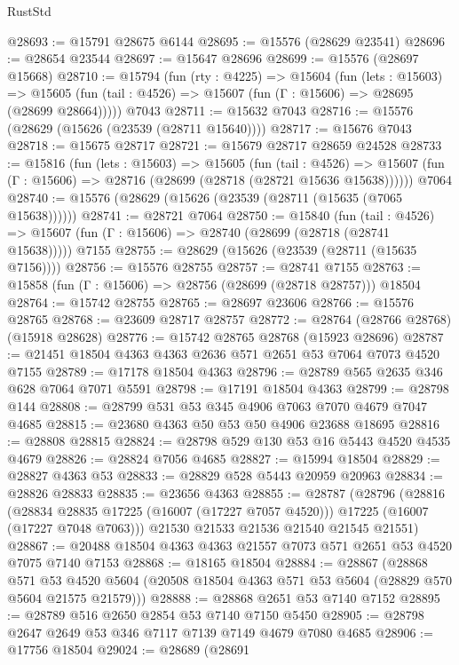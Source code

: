 \begin{lexlean}{RustStd}
\begin{coremodule}
@28693 := @15791 @28675 @6144
@28695 := @15576 (@28629 @23541)
@28696 := @28654 @23544
@28697 := @15647 @28696
@28699 := @15576 (@28697 @15668)
@28710 := @15794
    (fun (rty : @4225) =>
    @15604
      (fun (lets : @15603) =>
      @15605 (fun (tail : @4526) => @15607 (fun (Γ : @15606) => @28695 (@28699 @28664)))))
    @7043
@28711 := @15632 @7043
@28716 := @15576 (@28629 (@15626 (@23539 (@28711 @15640))))
@28717 := @15676 @7043
@28718 := @15675 @28717
@28721 := @15679 @28717 @28659 @24528
@28733 := @15816
    (fun (lets : @15603) =>
    @15605
      (fun (tail : @4526) =>
      @15607 (fun (Γ : @15606) => @28716 (@28699 (@28718 (@28721 @15636 @15638))))))
    @7064
@28740 := @15576 (@28629 (@15626 (@23539 (@28711 (@15635 (@7065 @15638))))))
@28741 := @28721 @7064
@28750 := @15840
    (fun (tail : @4526) => @15607 (fun (Γ : @15606) => @28740 (@28699 (@28718 (@28741 @15638)))))
    @7155
@28755 := @28629 (@15626 (@23539 (@28711 (@15635 @7156))))
@28756 := @15576 @28755
@28757 := @28741 @7155
@28763 := @15858 (fun (Γ : @15606) => @28756 (@28699 (@28718 @28757))) @18504
@28764 := @15742 @28755
@28765 := @28697 @23606
@28766 := @15576 @28765
@28768 := @23609 @28717 @28757
@28772 := @28764 (@28766 @28768) (@15918 @28628)
@28776 := @15742 @28765 @28768 (@15923 @28696)
@28787 := @21451 @18504 @4363 @4363 @2636 @571 @2651 @53 @7064 @7073 @4520 @7155
@28789 := @17178 @18504 @4363
@28796 := @28789 @565 @2635 @346 @628 @7064 @7071 @5591
@28798 := @17191 @18504 @4363
@28799 := @28798 @144
@28808 := @28799 @531 @53 @345 @4906 @7063 @7070 @4679 @7047 @4685
@28815 := @23680 @4363 @50 @53 @50 @4906 @23688 @18695
@28816 := @28808 @28815
@28824 := @28798 @529 @130 @53 @16 @5443 @4520 @4535 @4679
@28826 := @28824 @7056 @4685
@28827 := @15994 @18504
@28829 := @28827 @4363 @53
@28833 := @28829 @528 @5443 @20959 @20963
@28834 := @28826 @28833
@28835 := @23656 @4363
@28855 := @28787
    (@28796
      (@28816
        (@28834 @28835 @17225 (@16007 (@17227 @7057 @4520)))
        @17225
        (@16007 (@17227 @7048 @7063)))
      @21530
      @21533
      @21536
      @21540
      @21545
      @21551)
@28867 := @20488 @18504 @4363 @4363 @21557 @7073 @571 @2651 @53 @4520 @7075 @7140 @7153
@28868 := @18165 @18504
@28884 := @28867
    (@28868
      @571
      @53
      @4520
      @5604
      (@20508 @18504 @4363 @571 @53 @5604 (@28829 @570 @5604 @21575 @21579)))
@28888 := @28868 @2651 @53 @7140 @7152
@28895 := @28789 @516 @2650 @2854 @53 @7140 @7150 @5450
@28905 := @28798 @2647 @2649 @53 @346 @7117 @7139 @7149 @4679 @7080 @4685
@28906 := @17756 @18504
@29024 := @28689
    (@28691

\end{coremodule}
\end{lexlean}

